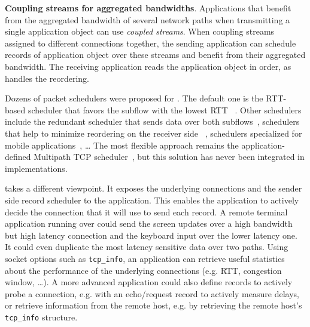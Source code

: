 

\textbf{Coupling streams for aggregated bandwidths}. Applications that benefit 
from the aggregated bandwidth of several network paths when transmitting a 
single 
application object can use \tcpls \textit{coupled streams}.  When coupling 
streams assigned to different \tcp connections
together, the sending application can schedule \tcpls records of application 
object over these 
streams and benefit from their aggregated bandwidth. The receiving application 
reads the application object in order, as \tcpls handles the reordering. 

Dozens of packet schedulers were proposed for \mptcp. The default one is the 
RTT-based scheduler that favors the subflow with the lowest RTT 
~\cite{paasch2014experimental}. Other schedulers include the redundant 
scheduler 
that sends data over both subflows~\cite{frommgen2016remp}, schedulers that 
help to minimize reordering on the receiver side~
\cite{lim2017ecf,hurtig2018low}, schedulers specialized for mobile 
applications~\cite{de2018tuning}, \ldots
The most flexible approach remains the application-defined Multipath TCP 
scheduler~\cite{frommgen2017programming}, but this solution has never been 
integrated in \mptcp implementations.

\tcpls takes a different viewpoint. It exposes the underlying \tcp connections 
and the sender side \tcpls record scheduler to the application. This enables 
the application to actively decide the \tcp connection that it will use to send 
each record. A remote terminal application running over \tcpls could send the 
screen updates over a high bandwidth but high latency connection and the 
keyboard input over the lower latency one. 
It could even duplicate the most latency sensitive data over two paths.
Using socket options such as 
\texttt{tcp\_info}, an application can retrieve useful statistics about the 
performance of the underlying \tcp connections (e.g. RTT, congestion window, 
\ldots). %
A more advanced application could also define \tcpls records to actively 
probe a connection, e.g. with an echo/request record to actively measure 
delays, or retrieve information from the remote host, e.g. by retrieving the 
remote host's \texttt{tcp\_info} structure.

